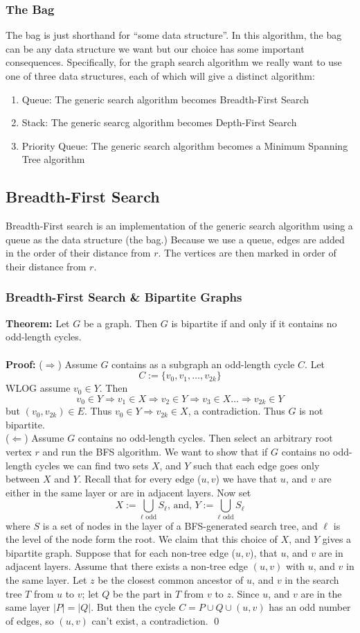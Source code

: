 \documentclass{article}
\newcommand{\imply}{\Rightarrow}
\newcommand{\thm}{\textbf{Theorem: }}
\newcommand{\proo}{\textbf{Proof: }}
\begin{document}
\subsubsection{The Bag}
The bag is just shorthand for ``some data structure''. In this algorithm, the bag can be any data structure we want but our choice has some important consequences. Specifically, for the graph search algorithm we really want to use one of three data structures, each of which will give a distinct algorithm:
\begin{enumerate}
	\item Queue: The generic search algorithm becomes Breadth-First Search
	\item Stack: The generic searcg algorithm becomes Depth-First Search
	\item Priority Queue: The generic search algorithm becomes a Minimum Spanning Tree algorithm
\end{enumerate}
\subsection{Breadth-First Search}
Breadth-First search is an implementation of the generic search algorithm using a queue as the data structure (the bag.) Because we use a queue, edges are added in the order of their distance from $r$. The vertices are then marked in order of their distance from $r$.
\subsubsection{Breadth-First Search \& Bipartite Graphs}
\thm Let $G$ be a graph. Then $G$ is bipartite if and only if it contains no odd-length cycles.\\\\
\proo ($\imply$) Assume $G$ contains as a subgraph an odd-length cycle $C$. Let
\[C := \{v_0, v_1, \dots, v_{2k}\}\]
WLOG assume $v_0 \in Y$. Then
\[v_0 \in Y \imply v_1 \in X \imply v_2 \in Y \imply v_3 \in X \dots \imply v_{2k} \in Y\]
but $(v_0, v_{2k}) \in E$. Thus $v_0 \in Y \imply v_{2k} \in X$, a contradiction. Thus $G$ is not bipartite.\\
($\Leftarrow$) Assume $G$ contains no odd-length cycles. Then select an arbitrary root vertex $r$ and run the BFS algorithm. We want to show that if $G$ contains no odd-length cycles we can find two sets $X$, and $Y$ such that each edge goes only between $X$ and $Y$. Recall that for every edge ($u, v$) we have that $u$, and $v$ are either in the same layer or are in adjacent layers. Now set
\[X := \bigcup_{\ell \text{ odd}} S_{\ell} \text{, and, } Y := \bigcup_{\ell \text{ odd}} S_{\ell}\]
where $S$ is a set of nodes in the layer of a BFS-generated search tree, and $\ell$ is the level of the node form the root. We claim that this choice of $X$, and $Y$ gives a bipartite graph. Suppose that for each non-tree edge ($u, v$), that $u$, and $v$ are in adjacent layers. Assume that there exists a non-tree edge $(u, v)$ with $u$, and $v$ in the same layer. Let $z$ be the closest common ancestor of $u$, and $v$ in the search tree $T$ from $u$ to $v$; let $Q$ be the part in $T$ from $v$ to $z$. Since $u$, and $v$ are in the same layer $|P| = |Q|$. But then the cycle $C = P \cup Q \cup (u, v)$ has an odd number of edges, so $(u, v)$ can't exist, a contradiction.
\qed
\end{document}
